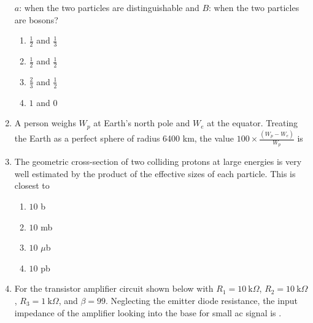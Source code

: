 \documentclass{article}
\newcommand{\brak}[1]{\left( #1 \right)}
\begin{document}
\begin{enumerate}
$a$: when the two particles are distinguishable and $B$: when the two particles are bosons?  

\begin{enumerate}
    \item  $\frac{1}{2}$ and  $\frac{1}{3}$
    \item  $\frac{1}{2}$ and $\frac{1}{2}$
\item  $\frac{2}{3}$ and  $\frac{1}{2}$
    \item  $1$ and  $0$
\end{enumerate}

\item A person weighs $W_p$ at Earth's north pole and $W_e$ at the equator. Treating the Earth as a perfect sphere of radius 6400 km, the value $100 \times \frac{\brak{W_p - W_e}}{W_p}$ is 

\item The geometric cross-section of two colliding protons at large energies is very well estimated by the product of the effective sizes of each particle. This is closest  
 to

\begin{enumerate}
    \item $10$ b
    \item $10$ mb
    \item $10$ $\mu$b
    \item $10$ pb
\end{enumerate}

\item For the transistor amplifier circuit shown below with $R_1 = 10~\text{k}\Omega$, $R_2 = 10~\text{k}\Omega$, $R_3 = 1~\text{k}\Omega$, and $\beta = 99$. Neglecting the emitter diode resistance, the input impedance of the amplifier looking into the base for small ac  
 signal is . 

 \begin{figure}[!ht]
\centering
{}%

\label{fig:my_label}
\end{figure}

\end{enumerate}
\end{document}
